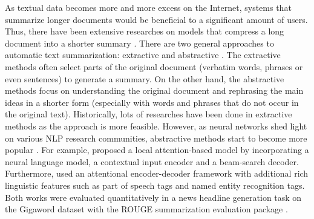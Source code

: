 As textual data becomes more and more excess on the Internet, systems that summarize longer documents would be beneficial to a significant amount of users. Thus, there have been extensive researches on models that compress a long document into a shorter summary \cite{gambhir2017recent}. There are two general approaches to automatic text summarization: extractive and abstractive \cite{gupta2010survey}. The extractive methods often select parts of the original document (verbatim words, phrases or even sentences) to generate a summary. On the other hand, the abstractive methods focus on understanding the original document and rephrasing the main ideas in a shorter form (especially with words and phrases that do not occur in the original text). Historically, lots of researches have been done in extractive methods as the approach is more feasible. However, as neural networks shed light on various NLP research communities, abstractive methods start to become more popular \cite{nallapati2016sequence, nallapati2016abstractive, rush2015neural}. For example, \cite{rush2015neural} proposed a local attention-based model by incorporating a neural language model, a contextual input encoder and a beam-search decoder. Furthermore, \cite{nallapati2016abstractive} used an attentional encoder-decoder framework with additional rich linguistic features such as part of speech tags and named entity recognition tags. Both works were evaluated quantitatively in a news headline generation task on the Gigaword dataset \cite{graff2003english} with the ROUGE summarization evaluation package \cite{lin2004rouge}. 